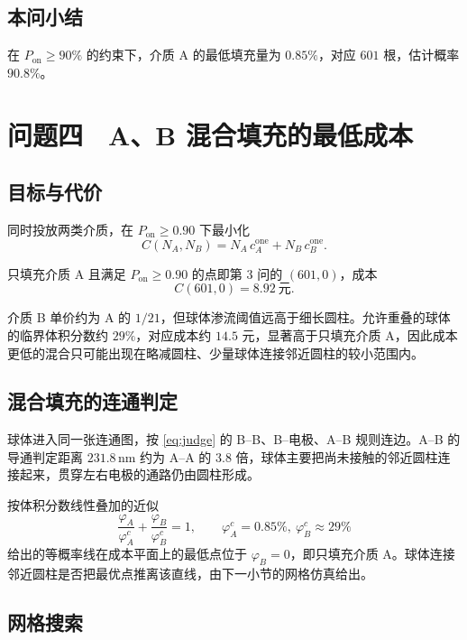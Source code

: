 \documentclass[UTF8,a4paper,zihao=-4,fontset=none]{ctexart}
\begin{document}
\subsection{本问小结}

在 $P_{\mathrm{on}}\ge 90\%$ 的约束下，介质 A 的最低填充量为 $0.85\%$，对应 $601$ 根，估计概率 $90.8\%$。

\section{问题四　A、B 混合填充的最低成本}

\subsection{目标与代价}

同时投放两类介质，在 $P_{\mathrm{on}}\ge 0.90$ 下最小化
\begin{equation}
C(N_A,N_B)=N_A\,c_A^{\mathrm{one}}+N_B\,c_B^{\mathrm{one}}.
\label{eq:cost}
\end{equation}

只填充介质 A 且满足 $P_{\mathrm{on}}\ge 0.90$ 的点即第 3 问的 $(601,0)$，成本
\[
C(601,0)=8.92\ \text{元}.
\]

介质 B 单价约为 A 的 $1/21$，但球体渗流阈值远高于细长圆柱。允许重叠的球体的临界体积分数约 $29\%$，对应成本约 $14.5$ 元，显著高于只填充介质 A，因此成本更低的混合只可能出现在略减圆柱、少量球体连接邻近圆柱的较小范围内。

\subsection{混合填充的连通判定}

球体进入同一张连通图，按 \eqref{eq:judge} 的 B--B、B--电极、A--B 规则连边。A--B 的导通判定距离 $231.8\,\mathrm{nm}$ 约为 A--A 的 $3.8$ 倍，球体主要把尚未接触的邻近圆柱连接起来，贯穿左右电极的通路仍由圆柱形成。

按体积分数线性叠加的近似
\begin{equation}
\frac{\varphi_A}{\varphi_A^c}+\frac{\varphi_B}{\varphi_B^c}=1,
\qquad \varphi_A^c=0.85\%,\ \varphi_B^c\approx 29\%
\label{eq:mix}
\end{equation}
给出的等概率线在成本平面上的最低点位于 $\varphi_B=0$，即只填充介质 A。球体连接邻近圆柱是否把最优点推离该直线，由下一小节的网格仿真给出。

\subsection{网格搜索}
\end{document}
